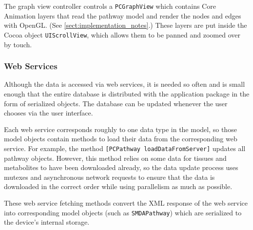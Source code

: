 The graph view controller controls a \texttt{PCGraphView} which contains Core
Animation layers that read the pathway model and render the nodes and edges with
OpenGL. (See \ref{sect:implementation_notes}.) These layers are put inside the
Cocoa object \texttt{UIScrollView}, which allows them to be panned and zoomed
over by touch.

\subsubsection{Web Services}
\label{sect:maw_web_services}

Although the data is accessed via web services, it is needed so often and is
small enough that the entire database is distributed with the application
package in the form of serialized objects. The database can be updated whenever
the user chooses via the user interface.

Each web service corresponds roughly to one data type in the model, so those
model objects contain methods to load their data from the corresponding web
service. For example, the method \texttt{[PCPathway loadDataFromServer]}
updates all pathway objects. However, this method relies on some data for
tissues and metabolites to have been downloaded already, so the data update
process uses mutexes and asynchronous network requests to ensure that the data
is downloaded in the correct order while using parallelism as much as possible.

These web service fetching methods convert the XML response of the web service
into corresponding model objects (such as \texttt{SMDAPathway}) which are
serialized to the device's internal storage.


